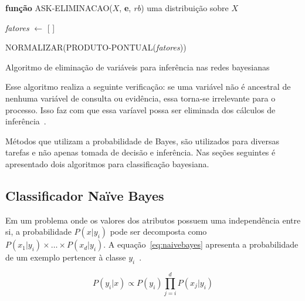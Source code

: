 \begin{algorithm}
    \textbf{função} ASK-ELIMINACAO($X$, \textbf{e}, \emph{rb}) \Retorna uma distribuição sobre $X$

    \emph{fatores} $\gets$ [ ]

    \Retorna NORMALIZAR(PRODUTO-PONTUAL(\emph{fatores}))
    \caption{Algoritmo de eliminação de variáveis para inferência nas redes bayesianas~\cite{russell:2002}}
    \label{alg:eliminacao-variaveis}
\end{algorithm}

Esse algoritmo realiza a seguinte verificação: se uma variável não é ancestral de nenhuma variável de consulta ou evidência, essa torna-se irrelevante para o processo. Isso faz com que essa varíavel possa ser eliminada dos cálculos de inferência~\cite{russell:2002}.

Métodos que utilizam a probabilidade de Bayes, são utilizados para diversas tarefas e não apenas tomada de decisão e inferência. Nas seções seguintes é apresentado dois algoritmos para classificação bayesiana.

\subsection{Classificador Naïve Bayes}
\label{sec:naivebayes}

Em um problema onde os valores dos atributos possuem uma independência entre si, a probabilidade $P(x|y_i)$ pode ser decomposta como $P(x_1|y_i) \times \dots \times P(x_d|y_i)$. A equação~\ref{eq:naivebayes} apresenta a probabilidade de um exemplo pertencer à classe $y_i$~\cite{faceli:2011}.

\begin{equation}
    \label{eq:naivebayes}
    P(y_i|x) \propto P(y_i) \prod_{j=i}^{d}P(x_j|y_i)
\end{equation}

